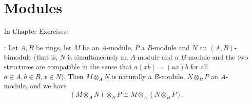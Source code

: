 \section{Modules}

In Chapter Exercises:

\begin{questions}

	: Let $A,B$ be rings, let $M$ be an $A$-module, $P$ a $B$-module and $N$ an $(A, B)$-bimodule (that is, $N$ is simultaneously an $A$-module and a $B$-module and the two structures are compatible in the sense that $a(xb) = (ax)b$ for all $a \in A, b\in B, x \in N)$. Then $M \otimes _A N$ is naturally a $B$-module, $N \otimes _B P$ an $A$-module, and we have
	\[
		(M \otimes _A N) \otimes _B P \cong M \otimes _A (N \otimes _B P)
	.\]
	\begin{solution}


\end{solution}
\end{questions}
